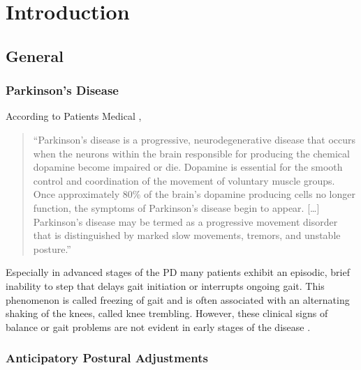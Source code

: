 \chapter{Introduction}
\label{ch:Introduction}

\section{General}

\subsection{Parkinson's Disease}

According to Patients Medical \cite{patients_medical_definition_2014}, \begin{quote}``Parkinson's disease is a progressive, neurodegenerative disease that occurs when the neurons within the brain responsible for producing the chemical dopamine become impaired or die. Dopamine is essential for the smooth control and coordination of the movement of voluntary muscle groups. Once approximately 80\% of the brain's dopamine producing cells no longer function, the symptoms of Parkinson's disease begin to appear. [\dots] Parkinson's disease may be termed as a progressive movement disorder that is distinguished by marked slow movements, tremors, and unstable posture.''\end{quote}

Especially in advanced stages of the \gls{PD} many patients exhibit an episodic, brief inability to step that delays gait initiation or interrupts ongoing gait. This phenomenon is called freezing of gait and is often associated with an alternating shaking of the knees, called knee trembling. However, these clinical signs of balance or gait problems are not evident in early stages of the disease \cite{mancini_anticipatory_2009}\cite{jacobs_knee_2009}.

\subsection{Anticipatory Postural Adjustments}

